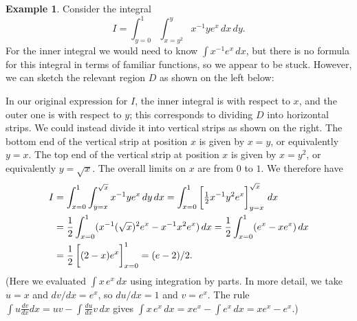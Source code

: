 \documentclass[reqno]{amsart}
\theoremstyle{definition}
\newtheorem{example}[theorem]{Example}
\begin{document}
\begin{example}
 Consider the integral
 \[ I = \int_{y=0}^1 \int_{x=y^2}^y x^{-1}y e^x\,dx\,dy. \]
 For the inner integral we would need to know $\int x^{-1}e^x\,dx$,
 but there is no formula for this integral in terms of familiar
 functions, so we appear to be stuck.  However, we can sketch the
 relevant region $D$ as shown on the left below:
 \begin{center}
  \hspace{5em}
 \end{center}
 In our original expression for $I$, the inner integral is with
 respect to $x$, and the outer one is with respect to $y$; this
 corresponds to dividing $D$ into horizontal strips.  We could instead
 divide it into vertical strips as shown on the right.  The bottom end 
 of the vertical strip at position $x$ is given by $x=y$, or
 equivalently $y=x$.  The top end of the vertical strip at position
 $x$ is given by $x=y^2$, or equivalently $y=\sqrt{x}$.  The overall
 limits on $x$ are from $0$ to $1$.  We therefore have
 \begin{align*}
  I &= \int_{x=0}^1 \int_{y=x}^{\sqrt{x}} x^{-1}ye^x\,dy\,dx 
     = \int_{x=0}^1\CH{\half x^{-1}y^2e^x}_{y=x}^{\sqrt{x}} \,dx \\
    &= \frac{1}{2}\int_{x=0}^1 (x^{-1}(\sqrt{x})^2e^x-x^{-1}x^2e^x)\,dx 
     = \frac{1}{2}\int_{x=0}^1 (e^x-xe^x)\,dx \\
    &= \frac{1}{2}\CH{(2-x)e^x}_{x=0}^1 
     = (e-2)/2.
 \end{align*}
 (Here we evaluated $\int x\,e^x\,dx$ using integration by parts.  In
 more detail, we take $u=x$ and $dv/dx=e^x$, so $du/dx=1$ and
 $v=e^x$.  The rule $\int u\frac{dv}{dx}dx=uv-\int\frac{du}{dx}v\,dx$
 gives $\int x\,e^x\,dx=xe^x-\int e^x\,dx=xe^x-e^x$.)
\end{example}
\end{document}
